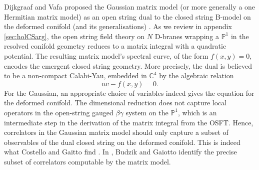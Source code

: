 \documentclass[english]{article}
\begin{document}
\begin{itemize}
    Dijkgraaf and Vafa proposed the Gaussian matrix model (or more generally a one Hermitian matrix model) as an open string dual to the closed string B-model on the deformed conifold (and its generalisations) \cite{DijkgraafVafa02,DVongeom02}. As we review in appendix \ref{sec:holCSarg}, the open string field theory on $N$ D-branes wrapping a $\mathbb{P}^1$ in the resolved conifold geometry reduces to a matrix integral with a quadratic potential. The resulting matrix model's spectral curve, of the form $f(x,y)=0$, encodes the emergent closed string geometry. More precisely, the dual is believed to be a non-compact Calabi-Yau, embedded in $\mathbb{C}^{4}$ by the algebraic relation
    \begin{equation} \label{eq:cy3target}
    uv-f(x,y)=0.
    \end{equation}
    For the Gaussian, an appropriate choice of variables indeed gives the equation for the deformed conifold.  
    The dimensional reduction does not capture local operators in the open-string gauged $\beta \gamma$ system on the $\mathbb{P}^1$, which is an intermediate step in the derivation of the matrix integral from the OSFT. Hence, correlators in the Gaussian matrix model should only capture a subset of observables of the dual closed string on the deformed conifold. This is indeed what Costello and Gaitto find \cite{CostelloGaiottoTH}. In \cite{Budzik:2021fyh}, Budzik and Gaiotto identify the precise subset of correlators computable by the matrix model. 
    

\end{itemize}
\end{document}
